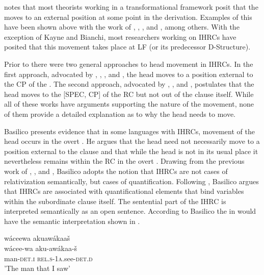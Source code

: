 \documentclass[output=paper]{LSP/langsci}
\begin{document}
\citet{Basilico1996} notes that most theorists working in a transformational framework posit that the  moves to an external position at some point in the derivation. Examples of this have been shown above with the work of \citet{Cole1982, Cole1987}, \citet{Williamson1987}, \citet{Culy1990}, \citet{Kayne1994} and \citet{Bianchi1999}, among others. With the exception of Kayne and Bianchi, most researchers working on IHRCs have posited that this movement takes place at LF (or its predecessor D-Structure). 

Prior to \citet{Basilico1996} there were two general approaches to head movement in IHRCs. In the first approach, advocated by \citet{Broadwell1985, Broadwell1987}, \citet{Cole1987}, \citet{LefebvreMuysken1988}, and \citet{ColeHermon1994}, the head moves to a position external to the CP of the . The second approach, advocated by \citet{Williamson1987}, \citet{Brassetal1989}, and \citet{Bonneau1992}, postulates that the head moves to the [SPEC, CP] of the RC but not out of the clause itself. While all of these works have arguments supporting the nature of the movement, none of them provide a detailed explanation as to why the head needs to move.  

Basilico presents evidence that in some languages with IHRCs, movement of the head occurs in the overt . He argues that the head need not necessarily move to a position external to the clause and that while the head is not in its usual place it nevertheless remains within the RC in the overt . Drawing from the previous work of \citet{Williamson1987}, \citet{Jelinek1987}, and \citet{Culy1990}, Basilico adopts the notion that IHRCs are not cases of relativization semantically, but cases of quantification. Following \citet{Heim1982}, Basilico argues that IHRCs are associated with quantificational elements that bind variables within the subordinate clause itself. The sentential part of the IHRC is interpreted semantically as an open sentence. According to Basilico the   in  would have the semantic interpretation shown in .

\ea \label{boyle42}
\glll w\'aceewa     akuaw\'akaa\v{s}\\
w\'acee-wa       aku-aw\'akaa-\v{s}\\
man-\textsc{det.i}  \textsc{rel.s-1a}.see-\textsc{det.d}\\
\trans 'The man that I saw'
\z
\end{document}
